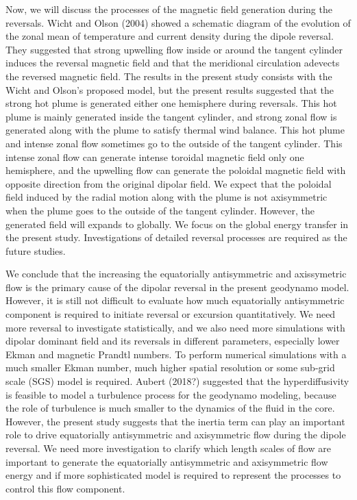 Now, we will discuss the processes of the magnetic field generation during the reversals. 
Wicht and Olson (2004) \cite{Wicht:2004} showed a schematic diagram of the evolution of the zonal mean of temperature and current density during the dipole reversal. 
They suggested that strong upwelling flow inside or around the tangent cylinder induces the reversal magnetic field and that the meridional circulation adevects the reversed magnetic field. 
The results in the present study consists with the Wicht and Olson's proposed model, but the present results suggested that the strong hot plume is generated either one hemisphere during reversals. 
This hot plume is mainly generated inside the tangent cylinder, and strong zonal flow is generated along with the plume to satisfy thermal wind balance. 
This hot plume and intense zonal flow sometimes go to the outside of the tangent cylinder. 
This intense zonal flow can generate intense toroidal magnetic field only one hemisphere, and the upwelling flow can generate the poloidal magnetic field with opposite direction from the original dipolar field. 
We expect that the poloidal field induced by the radial motion along with the plume is not axisymmetric when the plume goes to the outside of the tangent cylinder. 
However, the generated field will expands to globally. 
We focus on the global energy transfer in the present study. 
Investigations of detailed reversal processes are required as the future studies.

We conclude that the increasing the equatorially antisymmetric and axissymetric flow is the primary cause of the dipolar reversal in the present geodynamo model. 
However, it is still not difficult to evaluate how much equatorially antisymmetric component is required to initiate reversal or excursion quantitatively. 
We need more reversal to investigate statistically, and we also need more simulations with dipolar dominant field and its reversals in different parameters, especially lower Ekman and magnetic Prandtl numbers. 
To perform numerical simulations with a much smaller Ekman number, much higher spatial resolution or some sub-grid scale (SGS) model is required. 
Aubert (2018?) suggested that the hyperdiffusivity is feasible to model a turbulence process for the geodynamo modeling, because the role of turbulence is much smaller to the dynamics of the fluid in the core. 
However, the present study suggests that the inertia term can play an important role to drive equatorially antisymmetric and axisymmetric flow during the dipole reversal. 
We need more investigation to clarify which length scales of flow are important to generate the equatorially antisymmetric and axisymmetric flow energy and if more sophisticated model is required to represent the processes to control this flow component.

